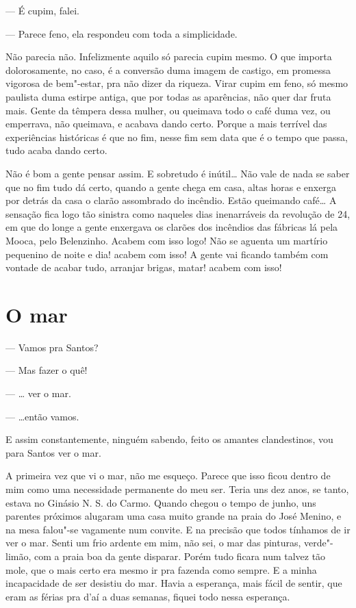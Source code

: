 --- É cupim, falei.

--- Parece feno, ela respondeu com toda a simplicidade.

Não parecia não. Infelizmente aquilo só parecia cupim mesmo. O que
importa dolorosamente, no caso, é a conversão duma imagem de castigo, em
promessa vigorosa de bem"-estar, pra não dizer da riqueza. Virar cupim em
feno, só mesmo paulista duma estirpe antiga, que por todas as
aparências, não quer dar fruta mais. Gente da têmpera dessa mulher, ou
queimava todo o café duma vez, ou emperrava, não queimava, e acabava
dando certo. Porque a mais terrível das experiências históricas é que no
fim, nesse fim sem data que é o tempo que passa, tudo acaba dando certo.

Não é bom a gente pensar assim. E sobretudo é inútil\ldots{} Não vale de nada
se saber que no fim tudo dá certo, quando a gente chega em casa, altas
horas e enxerga por detrás da casa o clarão assombrado do incêndio.
Estão queimando café\ldots{} A sensação fica logo tão sinistra como naqueles
dias inenarráveis da revolução de 24, em que do longe a gente enxergava
os clarões dos incêndios das fábricas lá pela Mooca, pelo Belenzinho.
Acabem com isso logo! Não se aguenta um martírio pequenino de noite e
dia! acabem com isso! A gente vai ficando também com vontade de acabar
tudo, arranjar brigas, matar! acabem com isso!

\chapter{O mar}

--- Vamos pra Santos?

--- Mas fazer o quê!

--- \ldots{} ver o mar.

--- \ldots{}então vamos.

E assim constantemente, ninguém sabendo, feito os amantes clandestinos,
vou para Santos ver o mar.

A primeira vez que vi o mar, não me esqueço. Parece que isso ficou
dentro de mim como uma necessidade permanente do meu ser. Teria uns dez
anos, se tanto, estava no Ginásio N. S. do Carmo. Quando chegou o tempo
de junho, uns parentes próximos alugaram uma casa muito grande na praia
do José Menino, e na mesa falou"-se vagamente num convite. E na precisão
que todos tínhamos de ir ver o mar. Senti um frio ardente em mim, não
sei, o mar das pinturas, verde"-limão, com a praia boa da gente disparar.
Porém tudo ficara num talvez tão mole, que o mais certo era mesmo ir pra
fazenda como sempre. E a minha incapacidade de ser desistiu do mar.
Havia a esperança, mais fácil de sentir, que eram as férias pra d'aí a
duas semanas, fiquei todo nessa esperança.

